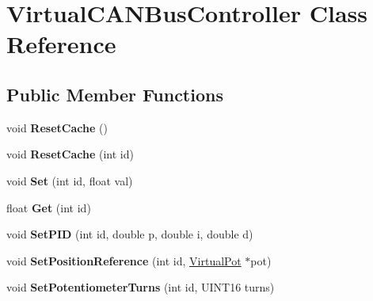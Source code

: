 \hypertarget{class_virtual_c_a_n_bus_controller}{
\section{\-Virtual\-C\-A\-N\-Bus\-Controller \-Class \-Reference}
\label{class_virtual_c_a_n_bus_controller}
}
\subsection*{\-Public \-Member \-Functions}
\begin{DoxyCompactItemize}
\item 
\hypertarget{class_virtual_c_a_n_bus_controller_af52f9431b8395d31f4da590eb749fad9}{
void {\bfseries \-Reset\-Cache} ()}
\label{class_virtual_c_a_n_bus_controller_af52f9431b8395d31f4da590eb749fad9}

\item 
\hypertarget{class_virtual_c_a_n_bus_controller_a4c03772a4c3420df4daa7bc38a66950e}{
void {\bfseries \-Reset\-Cache} (int id)}
\label{class_virtual_c_a_n_bus_controller_a4c03772a4c3420df4daa7bc38a66950e}

\item 
\hypertarget{class_virtual_c_a_n_bus_controller_a042d152415ca4da5e3a850d33dd4ceba}{
void {\bfseries \-Set} (int id, float val)}
\label{class_virtual_c_a_n_bus_controller_a042d152415ca4da5e3a850d33dd4ceba}

\item 
\hypertarget{class_virtual_c_a_n_bus_controller_aa3563aff7d4859057e325a68b1fbfc62}{
float {\bfseries \-Get} (int id)}
\label{class_virtual_c_a_n_bus_controller_aa3563aff7d4859057e325a68b1fbfc62}

\item 
\hypertarget{class_virtual_c_a_n_bus_controller_a543d77d1cb1487f17ec17cfd87015cfa}{
void {\bfseries \-Set\-P\-I\-D} (int id, double p, double i, double d)}
\label{class_virtual_c_a_n_bus_controller_a543d77d1cb1487f17ec17cfd87015cfa}

\item 
\hypertarget{class_virtual_c_a_n_bus_controller_a4858a2329b212282c45ab94a7c3f4b05}{
void {\bfseries \-Set\-Position\-Reference} (int id, \hyperlink{class_virtual_pot}{\-Virtual\-Pot} $\ast$pot)}
\label{class_virtual_c_a_n_bus_controller_a4858a2329b212282c45ab94a7c3f4b05}

\item 
\hypertarget{class_virtual_c_a_n_bus_controller_abfea4bffcdc9df34c8e13d3d89d93080}{
void {\bfseries \-Set\-Potentiometer\-Turns} (int id, \-U\-I\-N\-T16 turns)}
\label{class_virtual_c_a_n_bus_controller_abfea4bffcdc9df34c8e13d3d89d93080}


\end{DoxyCompactItemize}
